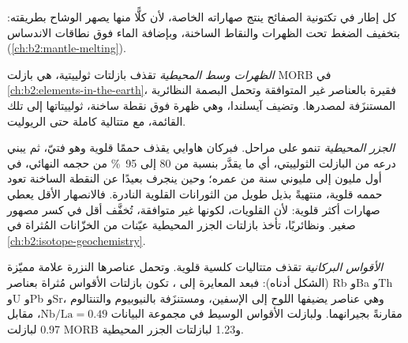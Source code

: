 كل إطار في تكتونية الصفائح ينتج صهاراته الخاصة، لأن كلًّا منها يصهر
الوشاح بطريقته: بتخفيف الضغط تحت الظهرات والنقاط الساخنة، وبإضافة الماء
فوق نطاقات الاندساس (\cref{ch:b2:mantle-melting}).

\emph{الظهرات وسط المحيطية} تقذف بازلتات ثولييتية، هي بازلت MORB في
\cref{ch:b2:elements-in-the-earth}، فقيرة بالعناصر غير المتوافقة وتحمل
البصمة النظائرية المستنزَفة لمصدرها. وتضيف آيسلندا، وهي ظهرة فوق نقطة ساخنة،
ثولييتاتها إلى تلك القائمة، مع متتالية كاملة حتى الريوليت.

\emph{الجزر المحيطية} تنمو على مراحل. فبركان هاوايي يقذف حممًا قلوية وهو
فتيّ، ثم يبني درعه من البازلت الثولييتي، أي ما يقدَّر بنسبة من 80 إلى
\qty{95}{\percent} من حجمه النهائي، في أول مليون إلى مليوني سنة من عمره؛ وحين
ينجرف بعيدًا عن النقطة الساخنة تعود حممه قلوية، منتهيةً بذيل طويل من
الثورانات القلوية النادرة. فالانصهار الأقل يعطي صهارات أكثر قلوية: لأن القلويات،
لكونها غير متوافقة، تُخفَّف أقل في كسر مصهور صغير. ونظائريًا، تأخذ بازلتات
الجزر المحيطية عيّنات من الخزّانات المُثراة في \cref{ch:b2:isotope-geochemistry}.

\emph{الأقواس البركانية} تقذف متتاليات كلسية قلوية. وتحمل عناصرها النزرة
علامة مميّزة (الشكل أدناه): فبعد المعايرة إلى ، تكون بازلتات
الأقواس مُثراة بعناصر Rb وBa وTh وU وPb وSr، وهي عناصر يضيفها اللوح إلى
الإسفين، ومستنزَفة بالنيوبيوم والتنتالوم مقارنةً بجيرانهما. ولبازلت
الأقواس الوسيط في مجموعة البيانات $\mathrm{Nb}/\mathrm{La} = 0.49$، مقابل 0.97 لبازلت MORB
و1.23 لبازلتات الجزر المحيطية.

